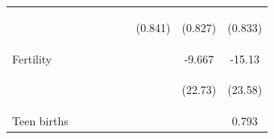 \documentclass[10pt,letterpaper,subeqn, xcolor=table]{beamer}
\begin{document}
\begin{frame}[label=otherPANEL]
\begin{table}[htpb!]
\begin{center}
{\begin{tabular}{lcccccccc}
        & \begin{footnotesize}\end{footnotesize} & \begin{footnotesize}\end{footnotesize} & \begin{footnotesize}\end{footnotesize} & \begin{footnotesize}\end{footnotesize} & \begin{footnotesize}\end{footnotesize} & \begin{footnotesize}(0.841)\end{footnotesize} & \begin{footnotesize}(0.827)\end{footnotesize} & \begin{footnotesize}(0.833)\end{footnotesize} \\

        Fertility&&&&&&&-9.667&-15.13\\

        & \begin{footnotesize}\end{footnotesize} & \begin{footnotesize}\end{footnotesize} & \begin{footnotesize}\end{footnotesize} & \begin{footnotesize}\end{footnotesize} & \begin{footnotesize}\end{footnotesize} & \begin{footnotesize}\end{footnotesize} & \begin{footnotesize}(22.73)\end{footnotesize} & \begin{footnotesize}(23.58)\end{footnotesize} \\

        Teen births&&&&&&&&0.793\\


\end{tabular}}
\end{center}
\end{table}
\end{frame}
\end{document}
